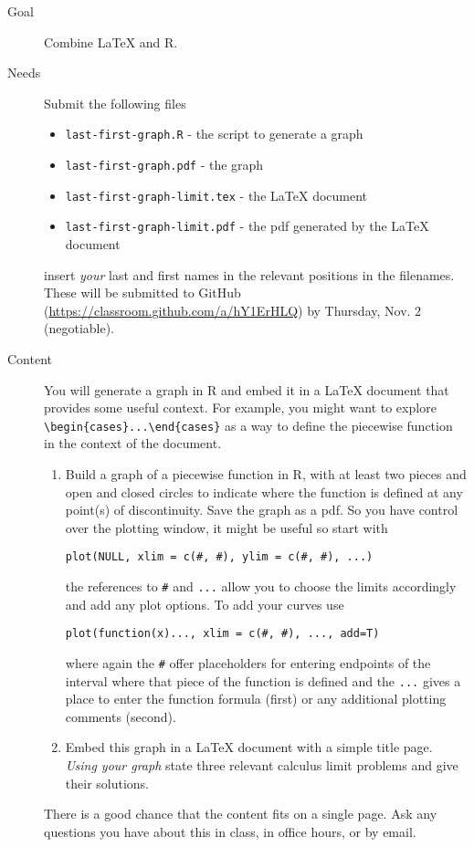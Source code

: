 \documentclass[12pt]{article}
\begin{document}
\begin{description}
\item[Goal] Combine {\LaTeX} and R.
\item[Needs] Submit the following files
\begin{itemize}
\item \texttt{last-first-graph.R} - the script to generate a graph
\item \texttt{last-first-graph.pdf} - the graph
\item \texttt{last-first-graph-limit.tex} - the {\LaTeX} document
\item \texttt{last-first-graph-limit.pdf} - the pdf generated by the {\LaTeX} document
\end{itemize}
insert \emph{your} last and first names in the relevant positions in the filenames. These will be submitted to GitHub (\url{https://classroom.github.com/a/hY1ErHLQ}) by Thursday, Nov. 2 (negotiable).
\item[Content] You will generate a graph in R and embed it in a {\LaTeX} document that provides some useful context.  For example,  you might want to explore \verb|\begin{cases}...\end{cases}| as a way to define the piecewise function in the context of the document.
\begin{enumerate}
\item Build a graph of a piecewise function in R, with at least two pieces and open and closed circles to indicate where the function is defined at any point(s) of discontinuity.  Save the graph as a pdf. So you have control over the plotting window, it might be useful so start with
\begin{verbatim}
plot(NULL, xlim = c(#, #), ylim = c(#, #), ...)
\end{verbatim}
the references to \verb|#| and \verb|...| allow you to choose the limits accordingly and add any plot options.  To add your curves use
\begin{verbatim}
plot(function(x)..., xlim = c(#, #), ..., add=T)
\end{verbatim}
where again the \verb|#| offer placeholders for entering endpoints of the interval where that piece of the function is defined and the \verb|...| gives a place to enter the function formula (first) or any additional plotting comments (second).
\item Embed this graph in a {\LaTeX} document with a simple title page. \emph{Using your graph} state three relevant calculus limit problems and give their solutions.
\end{enumerate}
There is a good chance that the content fits on a single page.  Ask any questions you have about this in class, in office hours, or by email.

\end{description}
\end{document}
